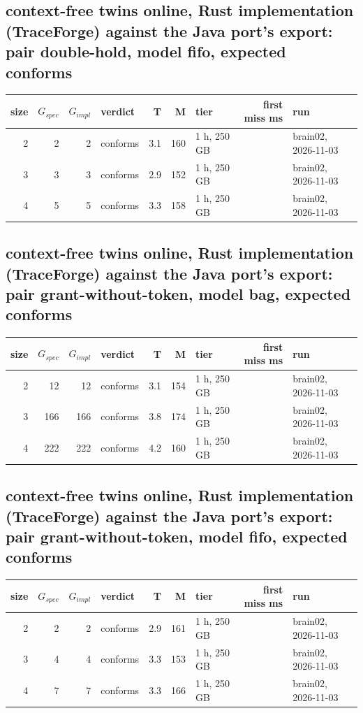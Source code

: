 \documentclass[10pt]{article}
\begin{document}
\subsection*{context-free twins online, Rust implementation (TraceForge) against the Java port's export: pair \textsf{double-hold}, model fifo, expected conforms}
\begin{longtable}{@{}rrrlrrlrl@{}}
\toprule
size & $G_{\mathit{spec}}$ & $G_{\mathit{impl}}$ & verdict & T & M & tier & first miss ms & run \\
\midrule
\endhead
\color{red} 2 & 2 & 2 & conforms & 3.1 & 160 & 1 h, 250 GB &  & brain02, 2026-11-03 \\
\color{red} 3 & 3 & 3 & conforms & 2.9 & 152 & 1 h, 250 GB &  & brain02, 2026-11-03 \\
\color{red} 4 & 5 & 5 & conforms & 3.3 & 158 & 1 h, 250 GB &  & brain02, 2026-11-03 \\
\bottomrule
\end{longtable}
\subsection*{context-free twins online, Rust implementation (TraceForge) against the Java port's export: pair \textsf{grant-without-token}, model bag, expected conforms}
\begin{longtable}{@{}rrrlrrlrl@{}}
\toprule
size & $G_{\mathit{spec}}$ & $G_{\mathit{impl}}$ & verdict & T & M & tier & first miss ms & run \\
\midrule
\endhead
\color{red} 2 & 12 & 12 & conforms & 3.1 & 154 & 1 h, 250 GB &  & brain02, 2026-11-03 \\
\color{red} 3 & 166 & 166 & conforms & 3.8 & 174 & 1 h, 250 GB &  & brain02, 2026-11-03 \\
\color{red} 4 & 222 & 222 & conforms & 4.2 & 160 & 1 h, 250 GB &  & brain02, 2026-11-03 \\
\bottomrule
\end{longtable}
\subsection*{context-free twins online, Rust implementation (TraceForge) against the Java port's export: pair \textsf{grant-without-token}, model fifo, expected conforms}
\begin{longtable}{@{}rrrlrrlrl@{}}
\toprule
size & $G_{\mathit{spec}}$ & $G_{\mathit{impl}}$ & verdict & T & M & tier & first miss ms & run \\
\midrule
\endhead
\color{red} 2 & 2 & 2 & conforms & 2.9 & 161 & 1 h, 250 GB &  & brain02, 2026-11-03 \\
\color{red} 3 & 4 & 4 & conforms & 3.3 & 153 & 1 h, 250 GB &  & brain02, 2026-11-03 \\
\color{red} 4 & 7 & 7 & conforms & 3.3 & 166 & 1 h, 250 GB &  & brain02, 2026-11-03 \\
\bottomrule
\end{longtable}
\end{document}
